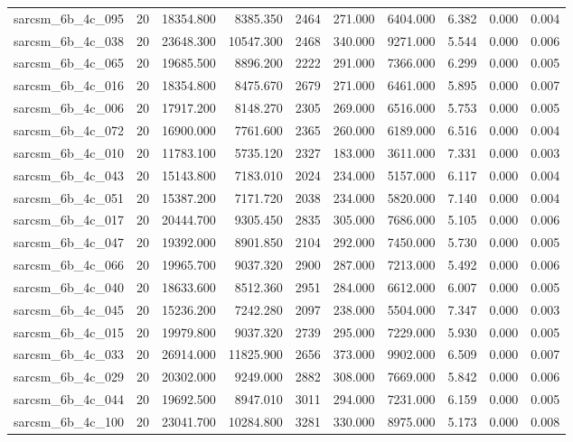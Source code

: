 \begin{tabular}{lrrrrrrrrr}
sarcsm\_6b\_4c\_095 & 20 & 18354.800 & 8385.350 & 2464 & 271.000 & 6404.000 & 6.382 & 0.000 & 0.004 \\
sarcsm\_6b\_4c\_038 & 20 & 23648.300 & 10547.300 & 2468 & 340.000 & 9271.000 & 5.544 & 0.000 & 0.006 \\
sarcsm\_6b\_4c\_065 & 20 & 19685.500 & 8896.200 & 2222 & 291.000 & 7366.000 & 6.299 & 0.000 & 0.005 \\
sarcsm\_6b\_4c\_016 & 20 & 18354.800 & 8475.670 & 2679 & 271.000 & 6461.000 & 5.895 & 0.000 & 0.007 \\
sarcsm\_6b\_4c\_006 & 20 & 17917.200 & 8148.270 & 2305 & 269.000 & 6516.000 & 5.753 & 0.000 & 0.005 \\
sarcsm\_6b\_4c\_072 & 20 & 16900.000 & 7761.600 & 2365 & 260.000 & 6189.000 & 6.516 & 0.000 & 0.004 \\
sarcsm\_6b\_4c\_010 & 20 & 11783.100 & 5735.120 & 2327 & 183.000 & 3611.000 & 7.331 & 0.000 & 0.003 \\
sarcsm\_6b\_4c\_043 & 20 & 15143.800 & 7183.010 & 2024 & 234.000 & 5157.000 & 6.117 & 0.000 & 0.004 \\
sarcsm\_6b\_4c\_051 & 20 & 15387.200 & 7171.720 & 2038 & 234.000 & 5820.000 & 7.140 & 0.000 & 0.004 \\
sarcsm\_6b\_4c\_017 & 20 & 20444.700 & 9305.450 & 2835 & 305.000 & 7686.000 & 5.105 & 0.000 & 0.006 \\
sarcsm\_6b\_4c\_047 & 20 & 19392.000 & 8901.850 & 2104 & 292.000 & 7450.000 & 5.730 & 0.000 & 0.005 \\
sarcsm\_6b\_4c\_066 & 20 & 19965.700 & 9037.320 & 2900 & 287.000 & 7213.000 & 5.492 & 0.000 & 0.006 \\
sarcsm\_6b\_4c\_040 & 20 & 18633.600 & 8512.360 & 2951 & 284.000 & 6612.000 & 6.007 & 0.000 & 0.005 \\
sarcsm\_6b\_4c\_045 & 20 & 15236.200 & 7242.280 & 2097 & 238.000 & 5504.000 & 7.347 & 0.000 & 0.003 \\
sarcsm\_6b\_4c\_015 & 20 & 19979.800 & 9037.320 & 2739 & 295.000 & 7229.000 & 5.930 & 0.000 & 0.005 \\
sarcsm\_6b\_4c\_033 & 20 & 26914.000 & 11825.900 & 2656 & 373.000 & 9902.000 & 6.509 & 0.000 & 0.007 \\
sarcsm\_6b\_4c\_029 & 20 & 20302.000 & 9249.000 & 2882 & 308.000 & 7669.000 & 5.842 & 0.000 & 0.006 \\
sarcsm\_6b\_4c\_044 & 20 & 19692.500 & 8947.010 & 3011 & 294.000 & 7231.000 & 6.159 & 0.000 & 0.005 \\
sarcsm\_6b\_4c\_100 & 20 & 23041.700 & 10284.800 & 3281 & 330.000 & 8975.000 & 5.173 & 0.000 & 0.008 \\

\end{tabular}
